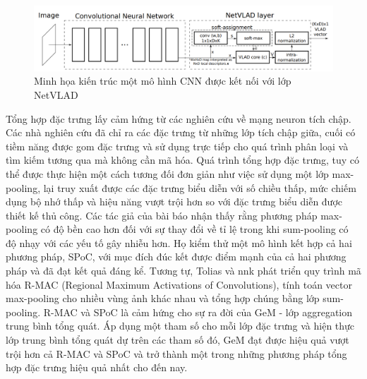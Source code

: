 \begin{figure}[h]
    \centering
    \includegraphics[width=\textwidth]{pics/Chapter2/netvladcnn.png}
    \caption{Minh họa kiến trúc một mô hình CNN được kết nối với lớp NetVLAD \cite{arandjelovic2016netvlad}}
\end{figure}

Tổng hợp đặc trưng lấy cảm hứng từ các nghiên cứu về mạng neuron tích chập. Các nhà nghiên cứu đã chỉ ra các đặc trưng từ những lớp tích chập giữa, cuối có tiềm năng được gom đặc trưng và sử dụng trực tiếp cho quá trình phân loại và tìm kiếm tương qua mà không cần mã hóa. Quá trình tổng hợp đặc trưng, tuy có thể được thực hiện một cách tương đối đơn giản như việc sử dụng một lớp max-pooling, lại truy xuất được các đặc trưng biểu diễn với số chiều thấp, mức chiếm dụng bộ nhớ thấp và hiệu năng vượt trội hơn so với đặc trưng biểu diễn được thiết kế thủ công. Các tác giả của bài báo \cite{mousavian2015deep} nhận thấy rằng phương pháp max-pooling có độ bền cao hơn đối với sự thay đổi về tỉ lệ trong khi sum-pooling có độ nhạy với các yếu tố gây nhiễu hơn. Họ kiểm thử một mô hình kết hợp cả hai phương pháp, SPoC, với mục đích đúc kết được điểm mạnh của cả hai phương pháp và đã đạt kết quả đáng kể. Tương tự, Tolias và nnk \cite{tolias2015particular} phát triển quy trình mã hóa R-MAC (Regional Maximum Activations of Convolutions), tính toán vector max-pooling cho nhiều vùng ảnh khác nhau và tổng hợp chúng bằng lớp sum-pooling. R-MAC và SPoC là cảm hứng cho sự ra đời của GeM \cite{GeM} - lớp aggregation trung bình tổng quát. Áp dụng một tham số cho mỗi lớp đặc trưng và hiện thực lớp trung bình tổng quát dự trên các tham số đó, GeM đạt được hiệu quả vượt trội hơn cả R-MAC và SPoC và trở thành một trong những phương pháp tổng hợp đặc trưng hiệu quả nhất cho đến nay.